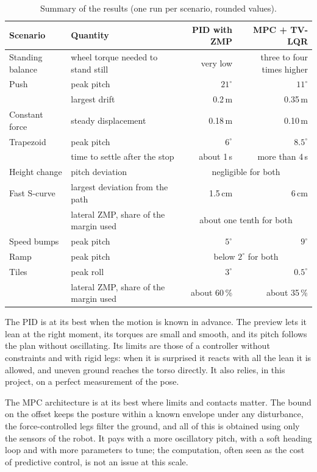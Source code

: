\documentclass[11pt,a4paper]{article}
\begin{document}
\begin{table}[t]
  \centering\small
  \caption{Summary of the results (one run per scenario, rounded values).}
  \label{tab:summary}
  \begin{tabularx}{\linewidth}{@{}l>{\raggedright\arraybackslash}Xrr@{}}
    \toprule
    Scenario & Quantity & PID with ZMP & MPC + TV-LQR \\
    \midrule
    Standing balance & wheel torque needed to stand still & very low & three to four times higher \\
    Push & peak pitch & $21^\circ$ & $11^\circ$ \\
         & largest drift & 0.2\,m & 0.35\,m \\
    Constant force & steady displacement & 0.18\,m & 0.10\,m \\
    Trapezoid & peak pitch & $6^\circ$ & $8.5^\circ$ \\
              & time to settle after the stop & about 1\,s & more than 4\,s \\
    Height change & pitch deviation & \multicolumn{2}{c}{negligible for both} \\
    Fast S-curve & largest deviation from the path & 1.5\,cm & 6\,cm \\
                 & lateral ZMP, share of the margin used & \multicolumn{2}{c}{about one tenth for both} \\
    Speed bumps & peak pitch & $5^\circ$ & $9^\circ$ \\
    Ramp & peak pitch & \multicolumn{2}{c}{below $2^\circ$ for both} \\
    Tiles & peak roll & $3^\circ$ & $0.5^\circ$ \\
          & lateral ZMP, share of the margin used & about 60\,\% & about 35\,\% \\
    \bottomrule
  \end{tabularx}
\end{table}

The PID is at its best when the motion is known in advance. The preview lets it lean at the right moment, its
torques are small and smooth, and its pitch follows the plan without oscillating. Its limits are those of a
controller without constraints and with rigid legs: when it is surprised it reacts with all the lean it is allowed,
and uneven ground reaches the torso directly. It also relies, in this project, on a perfect measurement of the pose.

The MPC architecture is at its best where limits and contacts matter. The bound on the offset keeps the posture
within a known envelope under any disturbance, the force-controlled legs filter the ground, and all of this is
obtained using only the sensors of the robot. It pays with a more oscillatory pitch, with a soft heading loop and
with more parameters to tune; the computation, often seen as the cost of predictive control, is not an issue at
this scale.
\end{document}
